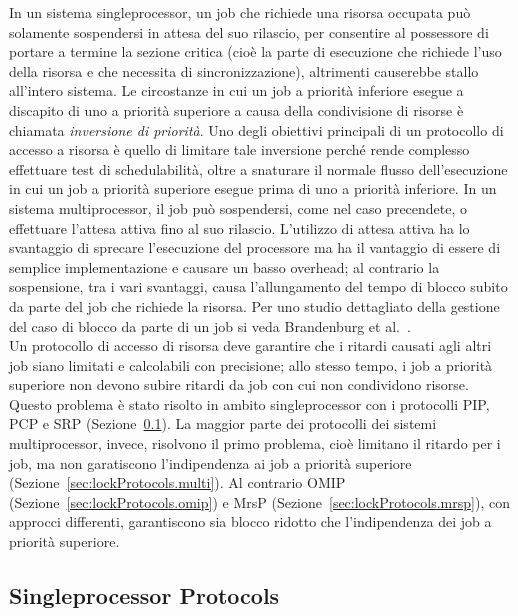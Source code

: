 In un sistema singleprocessor, un job che richiede una risorsa occupata può solamente sospendersi in attesa del suo rilascio, per consentire al possessore di portare a termine la sezione critica (cioè la parte di esecuzione che richiede l'uso della risorsa e che necessita di sincronizzazione), altrimenti causerebbe stallo all'intero sistema. Le circostanze in cui un job a priorità inferiore esegue a discapito di uno a priorità superiore a causa della condivisione di risorse è chiamata \textit{inversione di priorità}. Uno degli obiettivi principali di un protocollo di accesso a risorsa è quello di limitare tale inversione perché rende complesso effettuare test di schedulabilità, oltre a snaturare il normale flusso dell'esecuzione in cui un job a priorità superiore esegue prima di uno a priorità inferiore. In un sistema multiprocessor, il job può sospendersi, come nel caso precendete, o effettuare l'attesa attiva fino al suo rilascio. L'utilizzo di attesa attiva ha lo svantaggio di sprecare l'esecuzione del processore ma ha il vantaggio di essere di semplice implementazione e causare un basso overhead; al contrario la sospensione, tra i vari svantaggi, causa l'allungamento del tempo di blocco subito da parte del job che richiede la risorsa. Per uno studio dettagliato della gestione del caso di blocco da parte di un job si veda Brandenburg et al.~\cite{Brandenburg:2008:RSM:1440456.1440601}.\\

Un protocollo di accesso di risorsa deve garantire che i ritardi causati agli altri job siano limitati e calcolabili con precisione; allo stesso tempo, i job a priorità superiore non devono subire ritardi da job con cui non condividono risorse. Questo problema è stato risolto in ambito singleprocessor con i protocolli PIP, PCP e SRP (Sezione~\ref{sec:lockProtocols.single}). La maggior parte dei protocolli dei sistemi multiprocessor, invece, risolvono il primo problema, cioè limitano il ritardo per i job, ma non garatiscono l'indipendenza ai job a priorità superiore (Sezione~\ref{sec:lockProtocols.multi}). Al contrario OMIP (Sezione~\ref{sec:lockProtocols.omip}) e MrsP (Sezione~\ref{sec:lockProtocols.mrsp}), con approcci differenti, garantiscono sia blocco ridotto che l'indipendenza dei job a priorità superiore.\\

\subsection{Singleprocessor Protocols}
\label{sec:lockProtocols.single}

